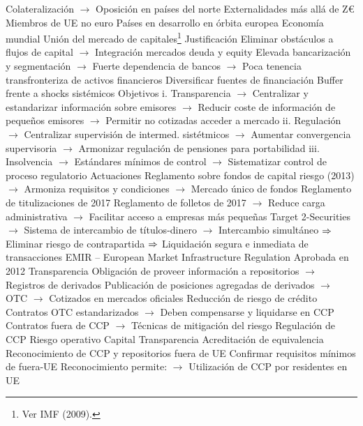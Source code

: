 \documentclass{nuevotema}
\begin{document}
\begin{esquemal}
				\4[] Colateralización
				\4[] $\to$ Oposición en países del norte
			\3 Externalidades más allá de Z€
				\4 Miembros de UE no euro
				\4 Países en desarrollo en órbita europea
				\4 Economía mundial
	\1 
		\2 Unión del mercado de capitales\footnote{Ver IMF (2009).}
			\3 Justificación
				\4 Eliminar obstáculos a flujos de capital
				\4[] $\to$ Integración mercados deuda y equity
				\4 Elevada bancarización y segmentación
				\4[] $\to$ Fuerte dependencia de bancos
				\4[] $\to$ Poca tenencia transfronteriza de activos financieros
				\4 Diversificar fuentes de financiación
				\4 Buffer frente a shocks sistémicos
			\3 Objetivos
				\4 i. Transparencia
				\4[] $\to$ Centralizar y estandarizar información sobre emisores
				\4[] $\to$ Reducir coste de información de pequeños emisores
				\4[] $\to$ Permitir no cotizadas acceder a mercado
				\4 ii. Regulación
				\4[] $\to$ Centralizar supervisión de intermed. sistétmicos
				\4[] $\to$ Aumentar convergencia supervisoria
				\4[] $\to$ Armonizar regulación de pensiones para portabilidad
				\4 iii. Insolvencia
				\4[] $\to$ Estándares mínimos de control
				\4[] $\to$ Sistematizar control de proceso regulatorio
			\3 Actuaciones
				\4 Reglamento sobre fondos de capital riesgo (2013)
				\4[] $\to$ Armoniza requisitos y condiciones
				\4[] $\to$ Mercado único de fondos
				\4 Reglamento de titulizaciones de 2017
				\4 Reglamento de folletos de 2017
				\4[] $\to$ Reduce carga administrativa
				\4[] $\to$ Facilitar acceso a empresas más pequeñas
				\4 Target 2-Securities
				\4[] $\to$ Sistema de intercambio de títulos-dinero
				\4[] $\to$ Intercambio simultáneo
				\4[] $\Rightarrow$ Eliminar riesgo de contrapartida
				\4[] $\Rightarrow$ Liquidación segura e inmediata de transacciones
			\3 EMIR -- European Market Infrastructure Regulation
				\4 Aprobada en 2012
				\4 Transparencia
				\4[] Obligación de proveer información a repositorios
				\4[] $\to$ Registros de derivados
				\4[] Publicación de posiciones agregadas de derivados
				\4[] $\to$ OTC
				\4[] $\to$ Cotizados en mercados oficiales
				\4 Reducción de riesgo de crédito
				\4[] Contratos OTC estandarizados
				\4[] $\to$ Deben compensarse y liquidarse en CCP
				\4[] Contratos fuera de CCP
				\4[] $\to$ Técnicas de mitigación del riesgo
				\4 Regulación de CCP
				\4[] Riesgo operativo
				\4[] Capital
				\4[] Transparencia
				\4 Acreditación de equivalencia
				\4[] Reconocimiento de CCP y repositorios fuera de UE
				\4[] Confirmar requisitos mínimos de fuera-UE
				\4[] Reconocimiento permite:
				\4[] $\to$ Utilización de CCP por residentes en UE

\end{esquemal}
\end{document}
